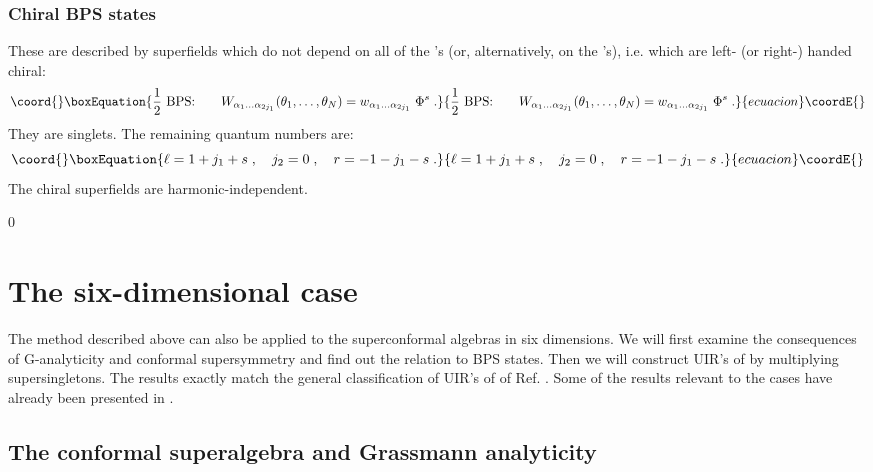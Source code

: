 \documentclass[a4paper,12pt]{article}
\begin{document}
\subsubsection{Chiral BPS states} 

These are described by superfields which do not depend on all of 
the \myHighlight{$\bar\theta$}\coordHE{}'s (or, alternatively, on the \myHighlight{$\theta$}\coordHE{}'s), i.e. 
which are left- (or right-) handed chiral: 
\begin{equation}\coord{}\boxEquation{\label{5.29}
{1\over 2}\mbox{ BPS:}\qquad W_{\alpha_1\ldots\alpha_{2j_1}} 
(\theta_{1},\ldots,\theta_{N}) = 
w_{\alpha_1\ldots\alpha_{2j_1}}\;\Phi^s\;.  
}{{1\over 2}\mbox{ BPS:}\qquad W_{\alpha_1\ldots\alpha_{2j_1}} 
(\theta_{1},\ldots,\theta_{N}) = 
w_{\alpha_1\ldots\alpha_{2j_1}}\;\Phi^s\;.  
}{ecuacion}\coordE{}\end{equation}
They are \coordHE{} singlets. The remaining quantum numbers 
are: 
\begin{equation}\coord{}\boxEquation{\label{5.30}
  \ell = 1+j_1+s\;, \quad j_2=0\;, \quad r = -1-j_1-s\;. 
}{\ell = 1+j_1+s\;, \quad j_2=0\;, \quad r = -1-j_1-s\;. 
}{ecuacion}\coordE{}\end{equation}
The chiral superfields are harmonic-independent.






\setcounter{equation}0 
\section{The six-dimensional case}
 
The method described above can also be applied to the 
superconformal algebras \coordHE{} in six dimensions. We 
will first examine the consequences of G-analyticity and conformal 
supersymmetry and find out the relation to BPS states. Then we 
will construct UIR's of \coordHE{} by multiplying 
supersingletons. The results exactly match the general 
classification of UIR's of \coordHE{} of Ref. 
\cite{Minw2}. Some of the results relevant to the cases \coordHE{}  
have already been presented in \cite{FS3}.  

\subsection{The conformal superalgebra \coordHE{} 
and Grassmann analyticity}
\end{document}
